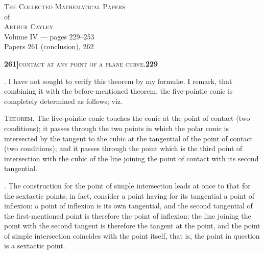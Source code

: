 \documentclass[11pt]{article}
\begin{document}
\thispagestyle{empty}
\begin{center}
\vspace*{2cm}
{\Large\scshape The Collected Mathematical Papers}\\[0.4em]
{\large of}\\[0.4em]
{\Large\scshape Arthur Cayley}\\[1.5em]
{\large Volume IV --- pages 229--253}\\[0.6em]
{\normalsize Papers 261 (conclusion), 262}\\[2em]
\vfill
\end{center}
\newpage

\setcounter{page}{229}


\noindent\textbf{261]}\hfill\textsc{contact at any point of a plane curve.}\hfill\textbf{229}

\medskip

. I have not sought to verify this theorem by my formul\ae. I remark, that combining it with the before-mentioned theorem, the five-pointic conic is completely determined as follows; viz.

\medskip

\noindent\textsc{Theorem.} The five-pointic conic touches the conic at the point of contact (two conditions); it passes through the two points in which the polar conic is intersected by the tangent to the cubic at the tangential of the point of contact (two conditions); and it passes through the point which is the third point of intersection with the cubic of the line joining the point of contact with its second tangential.

\medskip

. The construction for the point of simple intersection leads at once to that for the sextactic points; in fact, consider a point having for its tangential a point of inflexion: a point of inflexion is its own tangential, and the second tangential of the first-mentioned point is therefore the point of inflexion: the line joining the point with the second tangent is therefore the tangent at the point, and the point of simple intersection coincides with the point itself, that is, the point in question is a sextactic point.

\medskip
\end{document}
